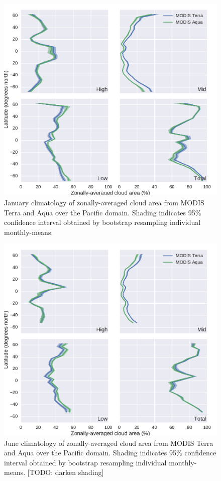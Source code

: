 \begin{figure}[htbp]
\centering
\includegraphics{graphics/misr_cldmodis_zonal_2008-01.pdf}
\caption{\label{fig:misr_cldmodis_zonal_january}January climatology of
zonally-averaged cloud area from MODIS Terra and Aqua over the Pacific
domain. Shading indicates 95\% confidence interval obtained by bootstrap
resampling individual
monthly-means.}\label{fig:misrux5fcldmodisux5fzonalux5fjanuary}
\end{figure}

\begin{figure}[htbp]
\centering
\includegraphics{graphics/misr_cldmodis_zonal_2008-06.pdf}
\caption{\label{fig:misr_cldmodis_zonal_june}June climatology of
zonally-averaged cloud area from MODIS Terra and Aqua over the Pacific
domain. Shading indicates 95\% confidence interval obtained by bootstrap
resampling individual monthly-means. {[}TODO: darken
shading{]}}\label{fig:misrux5fcldmodisux5fzonalux5fjune}
\end{figure}

